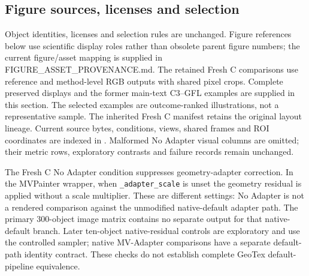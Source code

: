 \documentclass[11pt]{article}
\begin{document}
\subsection*{Figure sources, licenses and selection}
Object identities, licenses and selection rules are unchanged. Figure references below use scientific display roles rather than obsolete parent figure numbers; the current figure/asset mapping is supplied in FIGURE\_ASSET\_PROVENANCE.md.
The retained Fresh C comparisons use reference and method-level RGB outputs with shared pixel crops. Complete preserved displays and the former main-text C3--GFL examples are supplied in this section. The selected examples are outcome-ranked illustrations, not a representative sample. The inherited Fresh C manifest retains the original layout lineage. Current source bytes, conditions, views, shared frames and ROI coordinates are indexed in . Malformed No Adapter visual columns are omitted; their metric rows, exploratory contrasts and failure records remain unchanged.

The Fresh C No Adapter condition suppresses geometry-adapter correction. In the MVPainter wrapper, when \texttt{\_adapter\_scale} is unset the geometry residual is applied without a scale multiplier. These are different settings: No Adapter is not a rendered comparison against the unmodified native-default adapter path. The primary 300-object image matrix contains no separate output for that native-default branch. Later ten-object native-residual controls are exploratory and use the controlled sampler; native MV-Adapter comparisons have a separate default-path identity contract. These checks do not establish complete GeoTex default-pipeline equivalence.
\end{document}
